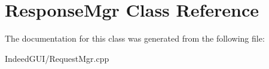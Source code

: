 \hypertarget{class_response_mgr}{}\section{Response\+Mgr Class Reference}
\label{class_response_mgr}


The documentation for this class was generated from the following file\+:\begin{DoxyCompactItemize}
\item 
Indeed\+G\+U\+I/Request\+Mgr.\+cpp\end{DoxyCompactItemize}
